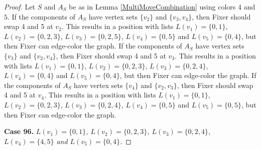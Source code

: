 \documentclass[12pt]{amsart}
\theoremstyle{plain}
\theoremstyle{definition}
\theoremstyle{remark}
\begin{document}
\begin{proof}
Let $S$ and $A_S$ be as in Lemma \ref{MultiMoveCombination} using colors $4$ and $5$. If the components of $A_S$ have vertex sets $\{v_2\}$ and $\{v_3, v_4\}$, then Fixer should swap 4 and 5 at $v_2$. This results in a position with lists $L(v_1) = \{0, 1\}$, $L(v_2) = \{0, 2, 3\}$, $L(v_3) = \{0, 2, 5\}$, $L(v_4) = \{0, 5\}$ and $L(v_5) = \{0, 4\}$, but then Fixer can edge-color the graph.
If the components of $A_S$ have vertex sets $\{v_3\}$ and $\{v_2, v_4\}$, then Fixer should swap 4 and 5 at $v_3$. This results in a position with lists $L(v_1) = \{0, 1\}$, $L(v_2) = \{0, 2, 3\}$, $L(v_3) = \{0, 2, 4\}$, $L(v_4) = \{0, 4\}$ and $L(v_5) = \{0, 4\}$, but then Fixer can edge-color the graph.
If the components of $A_S$ have vertex sets $\{v_4\}$ and $\{v_2, v_3\}$, then Fixer should swap 4 and 5 at $v_4$. This results in a position with lists $L(v_1) = \{0, 1\}$, $L(v_2) = \{0, 2, 3\}$, $L(v_3) = \{0, 2, 4\}$, $L(v_4) = \{0, 5\}$ and $L(v_5) = \{0, 5\}$, but then Fixer can edge-color the graph.

\noindent\textbf{Case 96.  }\textit{$L(v_1) = \{0, 1\}$, $L(v_2) = \{0, 2, 3\}$, $L(v_3) = \{0, 2, 4\}$, $L(v_4) = \{4, 5\}$ and $L(v_5) = \{0, 4\}$.}


\end{proof}
\end{document}
